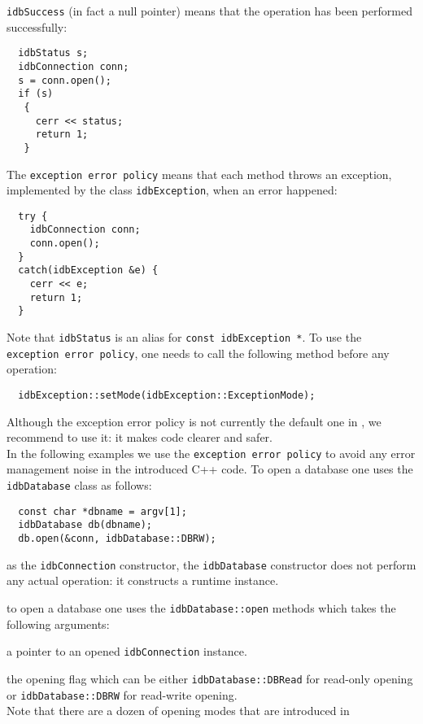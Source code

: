 \texttt{idbSuccess} (in fact a null pointer) means that the operation
has been performed successfully:
\bi
\item
\verbsize
\begin{verbatim}
  idbStatus s;
  idbConnection conn;
  s = conn.open();
  if (s)
   {
     cerr << status;
     return 1;
   }
\end{verbatim}
\normalsize
\ei
The \texttt{exception error policy} means that each \eyedb method throws
an exception, implemented by the class \texttt{idbException}, when an error
happened:
\bi
\item
\verbsize
\begin{verbatim}
  try {
    idbConnection conn;
    conn.open();
  }
  catch(idbException &e) {
    cerr << e;
    return 1;
  }
\end{verbatim}
\normalsize
\ei
Note that \texttt{idbStatus} is an alias for \texttt{const idbException *}.
To use the \texttt{exception error policy}, one needs to call the following
method before any operation:
\verbsize
\begin{verbatim}
  idbException::setMode(idbException::ExceptionMode);
\end{verbatim}
\normalsize
Although the exception error policy is not currently the default one in
\eyedbX, we recommend to use it: it makes code clearer and safer.
\\
In the following examples we use the \texttt{exception error policy}
to avoid any error management noise in the introduced C++ code.
\ee
{}
To open a database one uses the \texttt{idbDatabase} class as follows:
\verbsize
\begin{verbatim}
  const char *dbname = argv[1];
  idbDatabase db(dbname);
  db.open(&conn, idbDatabase::DBRW);
\end{verbatim}
\normalsize
\be
\item as the \texttt{idbConnection} constructor, the \texttt{idbDatabase}
constructor does not perform any actual operation: it constructs
a runtime instance.
\item to open a database one uses the \texttt{idbDatabase::open} methods
which takes the following arguments:
\be
\item a pointer to an opened \texttt{idbConnection} instance.
\item the opening flag which can be either \texttt{idbDatabase::DBRead} for
read-only opening or \texttt{idbDatabase::DBRW} for read-write opening.
\\
Note that there are a dozen of opening modes that are introduced in
